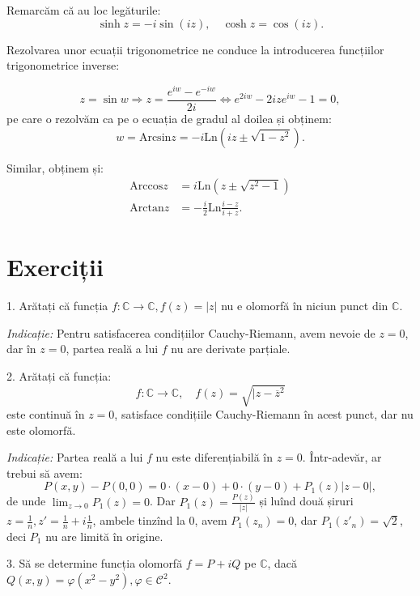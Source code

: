 \documentclass[11pt,a4paper]{article}
\newcommand\kal{\mathcal}
\newcommand\ds{\displaystyle}
\newcommand\CC{\mathbb{C}}
\theoremstyle{dotless}
\theoremstyle{dotlessdr}
\begin{document}
Remarcăm că au loc legăturile:
\[
  \sinh z = -i\sin(iz), \quad \cosh z = \cos(iz).
\]

Rezolvarea unor ecuații trigonometrice ne conduce la introducerea
funcțiilor trigonometrice inverse:

\[
  z = \sin w \Rightarrow z = \frac{e^{iw} - e^{-iw}}{2i} \Leftrightarrow %
  e^{2iw} - 2ize^{iw} - 1 = 0,
\]
pe care o rezolvăm ca pe o ecuația de gradul al doilea și obținem:
\[
  w = \mathrm{Arcsin}z = -i\mathrm{Ln}(iz \pm \sqrt{1 - z^2}).
\]

Similar, obținem și:
\begin{align*}
  \mathrm{Arccos}z &= i\mathrm{Ln}(z \pm \sqrt{z^2 - 1}) \\
  \mathrm{Arctan}z &= -\frac{i}{2}\mathrm{Ln}\frac{i - z}{i + z}.
\end{align*}


\section*{Exerciții}

1. Arătați că funcția $ f : \CC \to \CC, f(z) = |z| $ nu e olomorfă în
niciun punct din $ \CC $.

\emph{Indicație:} Pentru satisfacerea condițiilor Cauchy-Riemann, avem nevoie de
$ z = 0 $, dar în $ z = 0 $, partea reală a lui $ f $ nu are derivate parțiale.

\vspace{1cm}

2. Arătați că funcția:
\[
  f : \CC \to \CC, \quad f(z) = \sqrt{|z - \overline{z}^2}
\]
este continuă în $ z = 0 $, satisface condițiile Cauchy-Riemann în acest
punct, dar nu este olomorfă.

\emph{Indicație:} Partea reală a lui $ f $ nu este diferențiabilă în $ z = 0 $.
Într-adevăr, ar trebui să avem:
\[
  P(x, y) - P(0, 0) = 0 \cdot (x - 0) + 0 \cdot (y - 0) + P_1(z)|z - 0|,
\]
de unde $ \ds\lim_{z \to 0} P_1(z) = 0 $. Dar $ P_1(z) = \frac{P(z)}{|z|} $
și luînd două șiruri $ z = \frac{1}{n}, z' = \frac{1}{n} + i\frac{1}{n} $,
ambele tinzînd la $ 0 $, avem $ P_1(z_n) = 0 $, dar $ P_1(z'_n) = \sqrt{2} $,
deci $ P_1 $ nu are limită în origine.

\vspace{1cm}

3. Să se determine funcția olomorfă $ f = P + iQ $ pe $ \CC $, dacă
$ Q(x, y) = \varphi(x^2 - y^2), \varphi \in \kal{C}^2 $.
\end{document}
